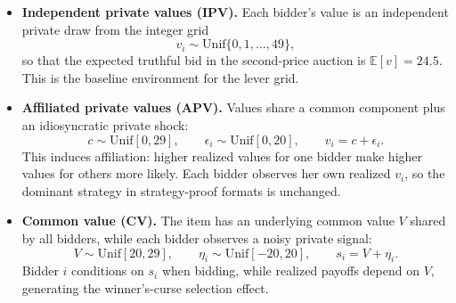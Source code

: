 \begin{itemize}
    \item \textbf{Independent private values (IPV).} Each bidder's value is an
    independent private draw from the integer grid
    \[
          v_{i} \sim \mathrm{Unif}\{0,1,\dots,49\},
    \]
    so that the expected truthful bid in the second-price auction is
    $\mathbb{E}[v]=24.5$. This is the baseline environment for the lever grid.

    \item \textbf{Affiliated private values (APV).} Values share a common
    component plus an idiosyncratic private shock:
    \[
        c \sim \mathrm{Unif}[0,29], \qquad \epsilon_{i} \sim \mathrm{Unif}[0,20],
        \qquad v_{i}=c+\epsilon_{i}.
    \]
    This induces affiliation: higher realized values for one bidder make higher
    values for others more likely. Each bidder observes her own realized
    $v_{i}$, so the dominant strategy in strategy-proof formats is unchanged.

    \item \textbf{Common value (CV).} The item has an underlying common value
    $V$ shared by all bidders, while each bidder observes a noisy private
    signal:
    \[
        V \sim \mathrm{Unif}[20,29], \qquad \eta_{i} \sim \mathrm{Unif}[-20,20],
        \qquad s_{i}=V+\eta_{i}.
    \]
    Bidder $i$ conditions on $s_{i}$ when bidding, while realized payoffs
    depend on $V$, generating the winner's-curse selection effect.
\end{itemize}

